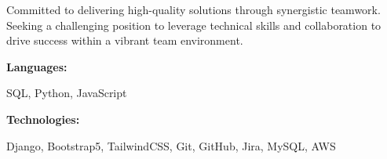 \documentclass[9pt]{developercv} %
\begin{document}
\begin{minipage}[t]{0.46\textwidth}
	\vspace{-6pt}
 
Committed to delivering high-quality solutions through synergistic teamwork. Seeking a challenging position to leverage technical skills and collaboration to drive success within a vibrant team environment.

\end{minipage}
\hfill %
\begin{minipage}[t]{0.465\textwidth}
    \vspace{-6pt}
    
    \begin{minipage}[t]{0.2\textwidth}
        \textbf{Languages:}
    \end{minipage}
    \hfill
    \begin{minipage}[t]{0.73\textwidth}
      SQL, Python, JavaScript
    \end{minipage}
    \vspace{4mm}
    
    \begin{minipage}[t]{0.2\textwidth}
        \textbf{Technologies:}
    \end{minipage}
    \hfill
    \begin{minipage}[t]{0.73\textwidth}
       Django, Bootstrap5, TailwindCSS, Git, GitHub, Jira, MySQL, AWS
    \end{minipage}
    
\end{minipage}
\end{document}

